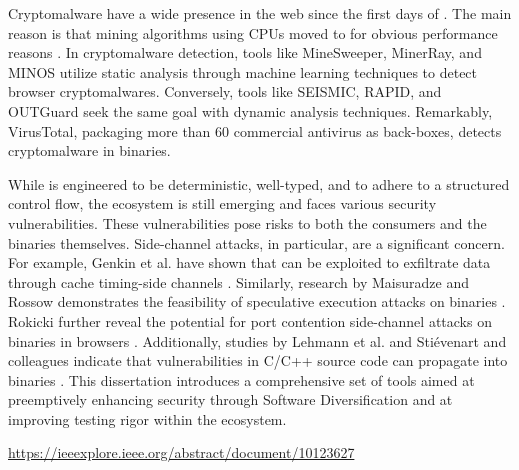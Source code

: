  Cryptomalware have a wide presence in the web since the first days of \wasm.
The main reason is that mining algorithms using CPUs moved to \wasm for obvious performance reasons \cite{musch2019new}. 
In cryptomalware detection, tools like MineSweeper\cite{Minesweeper}, MinerRay\cite{MinerRay}, and MINOS\cite{MINOS} utilize static analysis through machine learning techniques to detect browser cryptomalwares. 
Conversely, tools like SEISMIC\cite{SEISMIC}, RAPID\cite{RAPID}, and OUTGuard\cite{outguard} seek the same goal with dynamic analysis techniques.
Remarkably, VirusTotal, packaging more than 60 commercial antivirus as back-boxes, detects cryptomalware in \wasm binaries.




While \Wasm is engineered to be deterministic, well-typed, and to adhere to a structured control flow, the ecosystem is still emerging and faces various security vulnerabilities. 
These vulnerabilities pose risks to both the consumers and the \Wasm binaries themselves. 
Side-channel attacks, in particular, are a significant concern. 
For example, Genkin et al. have shown that \Wasm can be exploited to exfiltrate data through cache timing-side channels \cite{Genkin2018DrivebyKC}. 
Similarly, research by Maisuradze and Rossow demonstrates the feasibility of speculative execution attacks on \Wasm binaries \cite{ret2spec}. 
Rokicki \etal further reveal the potential for port contention side-channel attacks on \Wasm binaries in browsers \cite{10.1145/3488932.3517411}.
Additionally, studies by Lehmann et al. and Stiévenart and colleagues indicate that vulnerabilities in C/C++ source code can propagate into \Wasm binaries \cite{usenixWasm2020, DeRoover2022}. 
This dissertation introduces a comprehensive set of tools aimed at preemptively enhancing \Wasm security through Software Diversification and at improving testing rigor within the ecosystem.


 \url{https://ieeexplore.ieee.org/abstract/document/10123627}